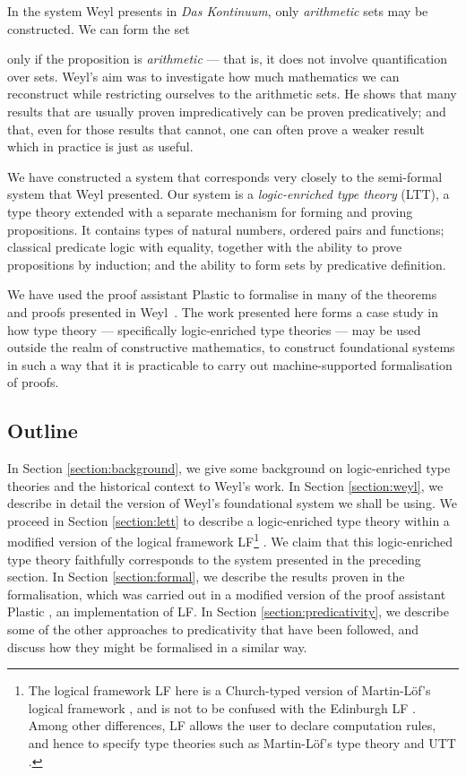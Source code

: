 \documentclass[acmtocl]{acmtrans2m}
\begin{document}
In the system Weyl presents in \emph{Das Kontinuum}, only \emph{arithmetic} sets may be constructed.  We can form the set

only if the proposition  is \emph{arithmetic} --- that is, it does not involve quantification over sets.
Weyl's aim was to investigate how much mathematics we can reconstruct while restricting ourselves to the arithmetic sets.
He shows that many results that are usually proven impredicatively can be proven predicatively; and
that, even for those results that cannot, one can often prove a weaker result which in practice is just as useful.

We have constructed a system  that corresponds very closely to the semi-formal system that Weyl presented.  Our system  is a \emph{logic-enriched type theory} (LTT), a type theory extended with a separate mechanism for forming and proving propositions.  It contains types of natural numbers, ordered pairs and functions; classical predicate logic with equality, together with the ability to prove propositions by induction; and the ability to form sets by predicative definition.

We have used the proof assistant Plastic to formalise in  many of the theorems and proofs presented in Weyl~.  The work presented here forms a case study in how type theory --- specifically logic-enriched type theories --- may be used outside the realm of constructive mathematics, to construct foundational systems in such a way that it is practicable to carry out machine-supported formalisation of proofs.






\subsection{Outline}

In Section \ref{section:background}, we give some background on logic-enriched type theories and the historical context to Weyl's work.
In Section \ref{section:weyl}, we describe in
detail the version of Weyl's foundational system we shall be using.
We proceed in Section \ref{section:lett} to describe a
logic-enriched type theory within a modified version of the logical
framework LF\footnote{The logical framework LF here is a Church-typed
version of Martin-L\"{o}f's logical framework \cite{pmltt}, and
is not to be confused with the Edinburgh LF \cite{ELF:93}.  Among other
differences, LF allows the user to declare computation rules,
and hence to specify type theories such as Martin-L\"{o}f's type theory
\cite{pmltt} and UTT \cite{luo:car}.} \cite{luo:car}.  We
claim that this logic-enriched type theory faithfully corresponds to
the system presented in the preceding section.
In Section \ref{section:formal}, we describe the results proven in the formalisation, which was carried out
in a modified version of the
proof assistant Plastic \cite{plastic}, an implementation of LF.
In Section \ref{section:predicativity}, we describe some of the other approaches to predicativity that have been followed, and discuss how they might be formalised in a similar way.
\end{document}
